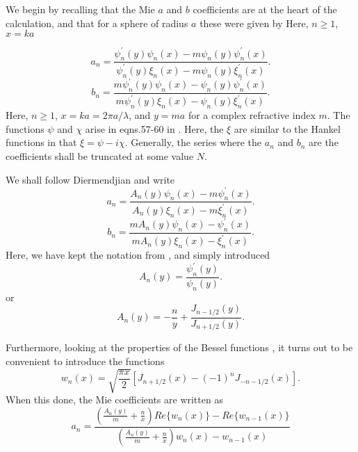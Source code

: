 We begin by recalling that the Mie $a$ and $b$ coefficients are at the heart of the calculation, and that for a sphere of radius $a$ these were given by
Here, $n \ge 1$, $x=ka$

\begin{equation}
a_n=\frac{\psi^\prime_n(y)\psi_n(x)-m \psi_n(y) \psi^\prime_n(x)}{
   \psi^\prime_n(y) \xi_n(x)-m \psi_n(y) \xi^\prime_n(x)}.
\end{equation}
\begin{equation}
b_n=\frac{m \psi^\prime_n(y)\psi_n(x)- \psi_n(y) \psi^\prime_n(x)}{
  m \psi^\prime_n(y) \xi_n(x)- \psi_n(y) \xi^\prime_n(x)}.
\end{equation}
Here, $n \ge 1$, $x=ka=2 \pi a / \lambda$, and $y=ma$ for a complex refractive index  $m$.   The functions $\psi$ and $\chi$ arise in eqns.57-60 in \cite{EMScatt:Mybib}. Here, the $\xi$ are similar to the Hankel functions in that
$\xi=\psi - i \chi$.
Generally, the series where the $a_n$ and $b_n$ are the coefficients shall be truncated at some value $N$.

We shall follow Diermendjian \cite{Deirmendjian:Mybib} and write
\begin{equation}
a_n=\frac{A_n(y) \psi_n(x)-m \psi^\prime_n(x)}{
   A_n(y) \xi_n(x)-m  \xi^\prime_n(x)}.
\end{equation}
\begin{equation}
b_n=\frac{m A_n(y)\psi_n(x)-  \psi^\prime_n(x)}{
  m A_n(y) \xi_n(x)- \xi^\prime_n(x)}.
\end{equation}
Here, we have kept the notation from \cite{EMScatt:Mybib} , and simply introduced\begin{equation}
A_n(y)=\frac{\psi_n^\prime(y)}{\psi_n(y)}.
\end{equation}
or 
\begin{equation}
A_n(y)=-\frac{n}{y}+\frac{J_{n-1/2}(y)}{J_{n+1/2}(y) }.
\end{equation}

Furthermore, looking at the properties of the Bessel functions \cite{AbramowitzStegun:Mybib}, it turns out to be convenient to introduce the functions
\begin{equation}
w_n(x)=\sqrt{\frac{\pi x}{2}} [ J_{n+1/2}(x)-(-1)^n J_{-n-1/2}(x)].
\end{equation}
When this done, the Mie coefficients are written as
\begin{equation}
a_n=\frac{ \left ( 
\frac{A_n(y)}{m}+\frac{n}{x}
 \right )
Re \lbrace w_n(x) \rbrace -Re \lbrace w_{n-1}(x) \rbrace
}
{ \left ( 
\frac{A_n(y)}{m}+\frac{n}{x} 
\right )
 w_n(x) - w_{n-1}(x) }
\end{equation}

